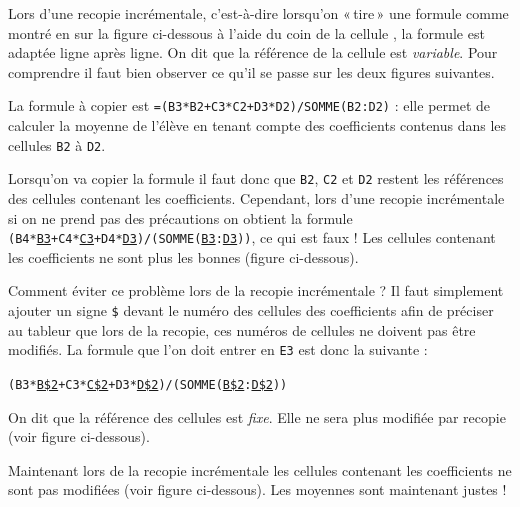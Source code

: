 Lors d'une recopie incrémentale, c'est-à-dire lorsqu'on «\,tire\,» une formule comme montré en  sur la figure ci-dessous à l'aide du coin de la cellule , la formule est adaptée ligne après ligne. On dit que la référence de la cellule est \emph{variable}. Pour comprendre il faut bien observer ce qu'il se passe sur les deux figures suivantes.


La formule à copier est \texttt{=(B3*B2+C3*C2+D3*D2)/SOMME(B2:D2)} : elle permet de calculer la moyenne de l'élève en tenant compte des coefficients contenus dans les cellules \texttt{B2} à \texttt{D2}.

Lorsqu'on va copier la formule il faut donc que \texttt{B2}, \texttt{C2} et \texttt{D2} restent les références des cellules contenant les coefficients. Cependant, lors d'une recopie incrémentale si on ne prend pas des précautions on obtient la formule \texttt{(B4*\underline{B3}+C4*\underline{C3}+D4*\underline{D3})/(SOMME(\underline{B3}:\underline{D3}))}, ce qui est faux ! Les cellules contenant les coefficients ne sont plus les bonnes (figure ci-dessous).


Comment éviter ce problème lors de la recopie incrémentale ? Il faut simplement ajouter un signe \texttt{\$} devant le numéro des cellules des coefficients afin de préciser au tableur que lors de la recopie, ces numéros de cellules ne doivent pas être modifiés. La formule que l'on doit entrer en \texttt{E3} est donc la suivante :

\begin{center}\texttt{(B3*\underline{B\$2}+C3*\underline{C\$2}+D3*\underline{D\$2})/(SOMME(\underline{B\$2}:\underline{D\$2}))}\end{center}

On dit que la référence des cellules est \emph{fixe}. Elle ne sera plus modifiée par recopie (voir figure ci-dessous).


Maintenant lors de la recopie incrémentale les cellules contenant les coefficients ne sont pas modifiées (voir figure ci-dessous). Les moyennes sont maintenant justes !



